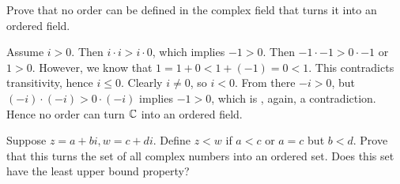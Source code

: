 \setcounter{problem}{7}
\begin{problem}
  Prove that no order can be defined in the complex field that turns it into an ordered field.
\end{problem}

\begin{solution}
  Assume $i > 0$.
  Then $i \cdot i > i \cdot 0$, which implies $-1 > 0$.
  Then $-1 \cdot -1 > 0 \cdot -1$ or $1 > 0$.
  However, we know that $1 = 1 + 0 < 1 + (-1) = 0 < 1$.
  This contradicts transitivity, hence $i \le 0$.
  Clearly $i \neq 0$, so $i < 0$.
  From there $-i > 0$, but $(-i) \cdot (-i) > 0 \cdot (-i)$ implies $-1 > 0$, which is , again, a contradiction.
  Hence no order can turn $\mathbb{C}$ into an ordered field.
\end{solution}

\begin{problem}
  Suppose $z = a + bi, w = c + di$.
  Define $z < w$ if $a < c$ or $a = c$ but $b < d$.
  Prove that this turns the set of all complex numbers into an ordered set.
  Does this set have the least upper bound property?
\end{problem}

